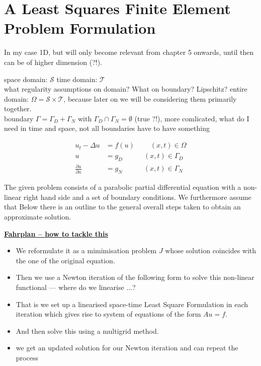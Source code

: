 \documentclass[fleqn, a4paper, 11pt, bibliography=totoc]{report}
\begin{document}
	\setlength{\mathindent}{0pt}
	\newtheorem{Definition}{Definition}
	\newtheorem{Theorem}{Theorem}

\chapter{A Least Squares Finite Element Problem Formulation}

In my case 1D, but will only become relevant from chapter 5 onwards, until then can be of higher dimension (?!). 

space domain: $\mathcal{S}$
time domain: $\mathcal{T}$
\\ what regularity assumptions on domain? What on boundary? Lipschitz? 
entire domain: $\Omega = \mathcal{S} \times \mathcal{T} $, because later on we will be considering them primarily together.  \\
boundary $\Gamma = \Gamma_D + \Gamma_N$ with $\Gamma_D \cap \Gamma_N = \emptyset$ (true ?!), more comlicated, what do I need in time and space, not all boundaries have to have something

\begin{align}
u_t - \Delta u &= f(u) \qquad \  (x,t) \in \Omega \\
u &= g_D \quad \qquad (x,t)  \in \Gamma_D \\
\frac{\partial u}{\partial n} &= g_N \quad \qquad (x,t) \in \Gamma_N
\end{align}

The given problem consists of a parabolic partial differential equation with a non-linear right hand side and a set of boundary conditions. We furthermore assume that  Below there is an outline to the general overall steps taken to obtain an approximate solution. 

\begin{framed}
	\underline{\textbf{Fahrplan -- how to tackle this}} 
	
	\begin{itemize}
\item  We reformulate it as a mimimisation problem $J$ whose solution coincides with the one of the original equation. 
\item Then we use a Newton iteration of the following form to solve this non-linear functional --- where do we linearise ...?
\item  That is we set up a linearised space-time Least Square Formulation in each iteration which gives rise to system of equations of the form $Au = f$.
\item  And then solve this using a multigrid method. 
\item we get an updated solution for our Newton iteration and can repeat the process
	\end{itemize}	
\end{framed}
\end{document}

